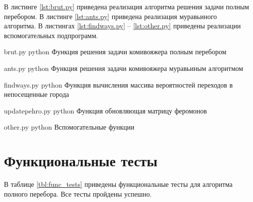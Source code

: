 В листинге \ref{lst:brut.py} приведена реализация алгоритма решения задачи полным перебором. 
В листинге \ref{lst:ants.py} приведена реализация муравьиного алгоритма.
В листингах \ref{lst:findways.py} -- \ref{lst:other.py} приведены реализации вспомогательных подпрограмм.

\clearpage
{}
{brut.py} %
{python} %
{Функция решения задачи комивояжера полным перебором} %

\clearpage

{ants.py} %
{python} %
{Функция решения задачи комивояжера муравьиным алгоритмом} %

\clearpage

{findways.py} %
{python} %
{Функция вычисления массива вероятностей переходов в непосещенные города} %

\clearpage

{updatepehro.py} %
{python} %
{Функция обновляющая матрицу феромонов} %

\clearpage

{other.py} %
{python} %
{Вспомогательные функции} %

\clearpage

\section{Функциональные тесты}

В таблице \ref{tbl:func_tests} приведены функциональные тесты для алгоритма полного перебора. Все тесты пройдены успешно.

